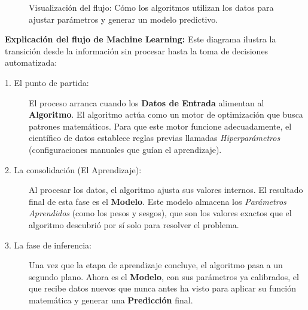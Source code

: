 \begin{figure}[htbp]
{%
    } %
    \caption{Visualización del flujo: Cómo los algoritmos utilizan los datos para ajustar parámetros y generar un modelo predictivo.}
    \label{fig:ml_flow}
\end{figure}

\noindent \textbf{Explicación del flujo de Machine Learning:}
Este diagrama ilustra la transición desde la información sin procesar hasta la toma de decisiones automatizada:

\begin{description}
    \item[1. El punto de partida:] El proceso arranca cuando los \textbf{Datos de Entrada} alimentan al \textbf{Algoritmo}. El algoritmo actúa como un motor de optimización que busca patrones matemáticos. Para que este motor funcione adecuadamente, el científico de datos establece reglas previas llamadas \textit{Hiperparámetros} (configuraciones manuales que guían el aprendizaje).
    
    \item[2. La consolidación (El Aprendizaje):] Al procesar los datos, el algoritmo ajusta sus valores internos. El resultado final de esta fase es el \textbf{Modelo}. Este modelo almacena los \textit{Parámetros Aprendidos} (como los pesos y sesgos), que son los valores exactos que el algoritmo descubrió por sí solo para resolver el problema.
    
    \item[3. La fase de inferencia:] Una vez que la etapa de aprendizaje concluye, el algoritmo pasa a un segundo plano. Ahora es el \textbf{Modelo}, con sus parámetros ya calibrados, el que recibe datos nuevos que nunca antes ha visto para aplicar su función matemática y generar una \textbf{Predicción} final.
\end{description}

